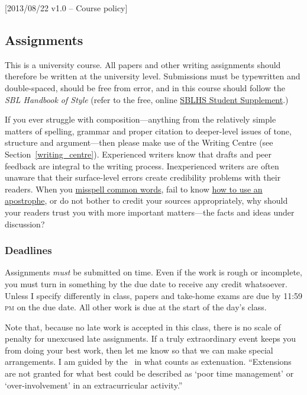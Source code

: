 [2013/08/22 v1.0 -- Course policy]

\subsection{Assignments}
\label{assignments}

This is a university course. All papers and other writing assignments
should therefore be written at the university level. Submissions must be
typewritten and double-spaced, should be free from error, and in this course
should follow the \emph{SBL Handbook of Style} (refer to the free, online
\href{http://sbl-site.org/assets/pdfs/sblhs_ss92804_revised_ed.pdf}{SBLHS
Student Supplement}.)

If you ever struggle with composition---anything from the relatively simple
matters of spelling, grammar and proper citation to deeper-level issues of
tone, structure and argument---then please make use of the Writing Centre (see
Section~\ref{writing_centre}). Experienced writers know that drafts and peer
feedback are integral to the writing process. Inexperienced writers are often
unaware that their surface-level errors create credibility problems with their
readers. When you \href{http://theoatmeal.com/comics/misspelling}{misspell
common words}, fail to know \href{http://theoatmeal.com/comics/apostrophe}{how
to use an apostrophe}, or do not bother to credit your sources appropriately,
why should your readers trust you with more important matters---the facts and
ideas under discussion?

\subsubsection{Deadlines}
\label{deadlines}

Assignments \emph{must} be submitted on time. Even if the work is rough or
incomplete, you must turn in something by the due date to receive any credit
whatsoever. Unless I specify differently in class, papers and take-home exams
are due by 11:59 \textsc{pm} on the due date. All other work is due at the
start of the day's class.

Note that, because no late work is accepted in this class, there is no scale
of penalty for unexcused late assignments. If a truly extraordinary event
keeps you from doing your best work, then let me know so that we can make
special arrangements. I am guided by the \AC\ in what counts as extenuation.
``Extensions are not granted for what best could be described as `poor time
management' or `over-involvement' in an extracurricular activity.''

